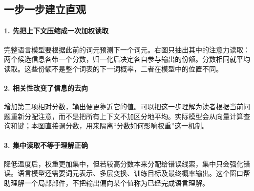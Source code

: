 \subsection*{一步一步建立直观}

\paragraph{1. 先把上下文压缩成一次加权读取}

完整语言模型要根据此前的词元预测下一个词元。右图只抽出其中的注意力读取：两个候选信息各带一个分数，归一化后决定各自参与输出的份额。分数相同就平均读取。这些份额不是整个词表的下一词概率，二者在模型中的位置不同。



\paragraph{2. 相关性改变了信息的去向}

增加第二项相对分数，输出便更靠近它的值。可以把这一步理解为读者根据当前问题重新分配注意，而不是把所有上下文不加区分地平均。实际模型会从向量计算查询和键；本图直接调分数，用来隔离“分数如何影响权重”这一机制。



\paragraph{3. 集中读取不等于理解正确}

降低温度后，权重更加集中，但若较高分数本来分配给错误线索，集中只会强化错误。语言模型还需要词元表示、多层变换、训练目标及最终概率输出。这个窗口帮助理解一个局部部件，不把输出偏向某个值称为已经完成语言理解。
